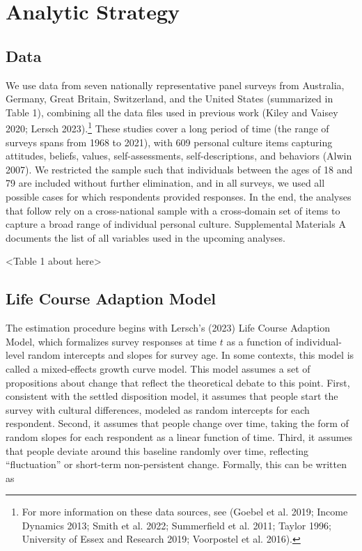 \documentclass[
  12pt,
]{article}
\begin{document}
\hypertarget{analytic-strategy}{%
\section{Analytic Strategy}\label{analytic-strategy}}

\hypertarget{data}{%
\subsection{Data}\label{data}}

We use data from seven nationally representative panel surveys from
Australia, Germany, Great Britain, Switzerland, and the United States
(summarized in Table 1), combining all the data files used in previous
work (Kiley and Vaisey 2020; Lersch 2023).\footnote{For more information
  on these data sources, see (Goebel et al. 2019; Income Dynamics 2013;
  Smith et al. 2022; Summerfield et al. 2011; Taylor 1996; University of
  Essex and Research 2019; Voorpostel et al. 2016).} These studies cover
a long period of time (the range of surveys spans from 1968 to 2021),
with 609 personal culture items capturing attitudes, beliefs, values,
self-assessments, self-descriptions, and behaviors (Alwin 2007). We
restricted the sample such that individuals between the ages of 18 and
79 are included without further elimination, and in all surveys, we used
all possible cases for which respondents provided responses. In the end,
the analyses that follow rely on a cross-national sample with a
cross-domain set of items to capture a broad range of individual
personal culture. Supplemental Materials A documents the list of all
variables used in the upcoming analyses.

\begin{center}
<Table 1 about here>
\end{center}

\hypertarget{life-course-adaption-model}{%
\subsection{Life Course Adaption
Model}\label{life-course-adaption-model}}

The estimation procedure begins with Lersch's (2023) Life Course
Adaption Model, which formalizes survey responses at time \(t\) as a
function of individual-level random intercepts and slopes for survey
age. In some contexts, this model is called a mixed-effects growth curve
model. This model assumes a set of propositions about change that
reflect the theoretical debate to this point. First, consistent with the
settled disposition model, it assumes that people start the survey with
cultural differences, modeled as random intercepts for each respondent.
Second, it assumes that people change over time, taking the form of
random slopes for each respondent as a linear function of time. Third,
it assumes that people deviate around this baseline randomly over time,
reflecting ``fluctuation'' or short-term non-persistent change.
Formally, this can be written as
\end{document}
